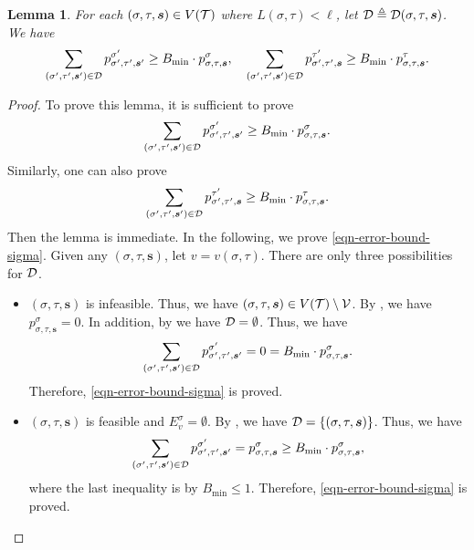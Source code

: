 \documentclass[11pt]{article}
\newtheorem{lemma}[theorem]{Lemma}
\newcommand{\seqS}{\boldsymbol{s}}
\begin{document}
    \begin{lemma} \label{lem:coupling-error}
       For each $(\sigma, \tau, \seqS) \in V(\+T)$ where $L(\sigma,\tau)<\ell$,
       let $\+D \triangleq \+D(\sigma, \tau, \seqS)$.
       We have
       \begin{align}\label{eqn-error-bound}
           \sum_{(\sigma', \tau', \seqS') \in \+D} p^{\sigma'}_{\sigma', \tau', \seqS'}\geq  B_{\min} \cdot p^{\sigma}_{\sigma, \tau, \seqS}, \quad \sum_{(\sigma',\tau', \seqS') \in \+D} p^{\tau'}_{\sigma', \tau', \seqS} \geq  B_{\min} \cdot p^{\tau}_{\sigma,\tau, \seqS}.
       \end{align}
    \end{lemma}
    \begin{proof}
    To prove this lemma, it is sufficient to prove \begin{align}\label{eqn-error-bound-sigma}
           \sum_{(\sigma', \tau', \seqS') \in \+D} p^{\sigma'}_{\sigma', \tau', \seqS'}\geq  B_{\min} \cdot p^{\sigma}_{\sigma, \tau, \seqS}.
       \end{align}
    Similarly, one can also prove 
    \[\sum_{(\sigma',\tau', \seqS') \in \+D} p^{\tau'}_{\sigma', \tau', \seqS} \geq  B_{\min} \cdot p^{\tau}_{\sigma,\tau, \seqS}.\] 
    Then the lemma is immediate.
    In the following, we prove \eqref{eqn-error-bound-sigma}.
    Given any $(\sigma, \tau, \seqS)$, let $v = v(\sigma,\tau)$. 
    There are only three possibilities for $\mathcal{D}$.
    \begin{itemize}
    \item $(\sigma,\tau,\seqS)$ is infeasible. Thus, we have $(\sigma,\tau,\seqS)\in V(\+T)\setminus \+V$.
    By , we have $p^{\sigma}_{\sigma, \tau, \seqS} = 0$.
    In addition, by  we have $\mathcal{D} = \emptyset$.
    Thus, we have
    \[\sum_{(\sigma', \tau', \seqS') \in \+D} p^{\sigma'}_{\sigma', \tau', \seqS'} = 0 =  B_{\min} \cdot p^{\sigma}_{\sigma, \tau, \seqS}.\]
    Therefore, \eqref{eqn-error-bound-sigma} is proved.
   
    \item $(\sigma,\tau,\seqS)$ is feasible and $E^{\sigma}_{v} = \emptyset$. By , we have 
    $\+D =\{(\sigma,\tau,\seqS)\}$.
    Thus, we have 
    \[\sum_{(\sigma', \tau', \seqS') \in \+D} p^{\sigma'}_{\sigma', \tau', \seqS'} =p^{\sigma}_{\sigma, \tau, \seqS} \geq  B_{\min} \cdot p^{\sigma}_{\sigma, \tau, \seqS},\]
    where the last inequality is by $B_{\min} \leq 1$.
    Therefore, \eqref{eqn-error-bound-sigma} is proved.
    

\end{itemize}
\end{proof}
\end{document}
